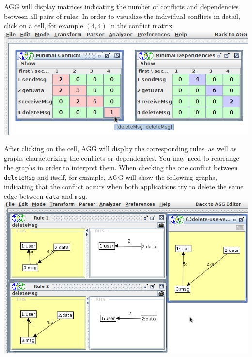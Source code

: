 \documentclass[12pt]{article}
\newenvironment{tutorialstep}
	{\hspace{-\parindent}\begin{minipage}{\textwidth}}
    {\vspace{.3cm}\end{minipage}}
\begin{document}
\begin{tutorialstep}
AGG will display matrices indicating the number of conflicts and dependencies between all pairs of rules. In order to visualize the individual conflicts in detail, click on a cell, for example $(4,4)$ in the conflict matrix. \\

\noindent
\centering
\includegraphics[scale = 0.5]{img/cpa/cpa_03.png}
\end{tutorialstep}

\begin{tutorialstep}
After clicking on the cell, AGG will display the corresponding rules, as well as graphs characterizing the conflicts or dependencies. You may need to rearrange the graphs in order to interpret them. When checking the one conflict between \texttt{deleteMsg} and itself, for example, AGG will show the following graphs, indicating that the conflict occurs when both applications try to delete the same edge between \texttt{data} and \texttt{msg}. \\

\noindent
\centering
\includegraphics[scale = 0.5]{img/cpa/cpa_04.png}
\end{tutorialstep}
\end{document}
